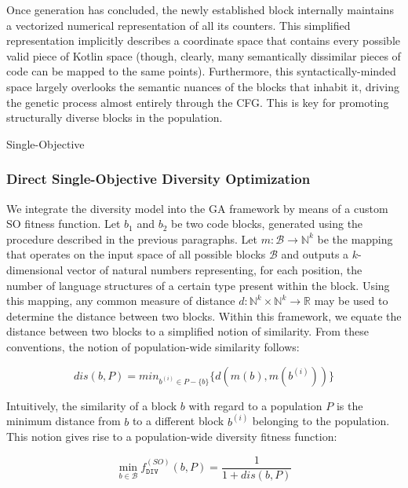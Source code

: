 Once generation has concluded, the newly established block
internally maintains a vectorized numerical representation of
all its counters.
This simplified representation implicitly describes a 
coordinate space that contains every possible valid piece of Kotlin space
(though, clearly, many semantically dissimilar pieces of code can be mapped to the same points).
Furthermore, this syntactically-minded space largely overlooks
the semantic nuances of the blocks that inhabit it, driving the genetic process
almost entirely through the \gls{CFG}.
This is key for promoting structurally diverse blocks in the population.

 {Single-Objective}

\subsubsection{\label{subsec:soga}Direct Single-Objective Diversity Optimization}

We integrate the
diversity model into the \gls{GA} framework by means of a custom \gls{SO} fitness function.
Let $b_1$ and $b_2$ be two code blocks, generated using the procedure
described in the previous paragraphs.
Let $m : \mathcal{B} \to \mathbb{N}^{k}$ be the mapping that operates
on the input space of all possible blocks $\mathcal{B}$ and outputs
a $k$-dimensional vector of natural numbers representing, for each position,
the number of language structures of a certain type present within the block.
Using this mapping, any common measure of distance
$d : \mathbb{N}^k \times \mathbb{N}^k \to \mathbb{R}$ may be used to determine
the distance between two blocks.
Within this framework, we equate the distance between two blocks to a
simplified notion of similarity.
From these conventions, the notion of population-wide 
similarity follows:

\begin{equation}
dis(b, P) = min_{b^{(i)} \in P - \{ b \}} \{ d(m(b), m(b^{(i)})) \}
\label{eq:sim}
\end{equation}


Intuitively, the similarity of a block $b$ with regard to a population
$P$ is the minimum distance from $b$ to a different block $b^{(i)}$
belonging to the population. 
This notion gives rise to a population-wide diversity fitness function:

\begin{equation}
\min_{b \in \mathcal{B}} f^{(SO)}_{\texttt{DIV}}(b, P) = \frac{1}{1 + dis(b, P)}
\end{equation}

